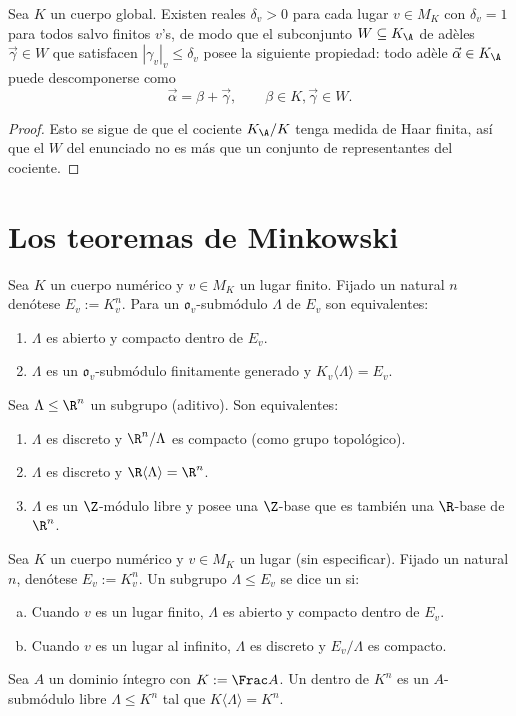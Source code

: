 \documentclass[teoria-numeros.tex]{subfiles}
\begin{document}
\begin{cor}\label{thm:adele_principal_descomposition}
	Sea $K$ un cuerpo global.
	Existen reales $\delta_v > 0$ para cada lugar $v \in M_K$ con $\delta_v = 1$ para todos salvo finitos $v$'s,
	de modo que el subconjunto $W \subseteq K_\A$ de adèles $\vec\gamma \in W$ que satisfacen $|\gamma_v|_v \le \delta_v$ posee la siguiente propiedad:
	todo adèle $\vec\alpha \in K_\A$ puede descomponerse como
	$$ \vec\alpha = \beta + \vec\gamma, \qquad \beta \in K, \vec\gamma \in W. $$
\end{cor}
\begin{proof}
	Esto se sigue de que el cociente $K_\A/K$ tenga medida de Haar finita, así que el $W$ del enunciado no es más que un conjunto de representantes
	del cociente.
\end{proof}

\section{Los teoremas de Minkowski}
\begin{lem}
	Sea $K$ un cuerpo numérico y $v \in M_K$ un lugar finito.
	Fijado un natural $n$ denótese $E_v := K_v^n$.
	Para un $\mathfrak{o}_v$-submódulo $\Lambda$ de $E_v$ son equivalentes:
	\begin{enumerate}
		\item $\Lambda$ es abierto y compacto dentro de $E_v$.
		\item $\Lambda$ es un $\mathfrak{o}_v$-submódulo finitamente generado y $K_v \langle \Lambda \rangle = E_v$.
	\end{enumerate}
\end{lem}

\begin{lem}
	Sea $\Lambda \le \R^n$ un subgrupo (aditivo).
	Son equivalentes:
	\begin{enumerate}
		\item $\Lambda$ es discreto y $\R^n/\Lambda$ es compacto (como grupo topológico).
		\item $\Lambda$ es discreto y $\R\langle \Lambda \rangle = \R^n$.
		\item $\Lambda$ es un $\Z$-módulo libre y posee una $\Z$-base que es también una $\R$-base de $\R^n$.
	\end{enumerate}
\end{lem}
\begin{mydef}
	Sea $K$ un cuerpo numérico y $v \in M_K$ un lugar (sin especificar).
	Fijado un natural $n$, denótese $E_v := K_v^n$.
	Un subgrupo $\Lambda \le E_v$ se dice un  si:
	\begin{enumerate}[(a)]
		\item Cuando $v$ es un lugar finito, $\Lambda$ es abierto y compacto dentro de $E_v$.
		\item Cuando $v$ es un lugar al infinito, $\Lambda$ es discreto y $E_v/\Lambda$ es compacto.
	\end{enumerate}

	Sea $A$ un dominio íntegro con $K := \Frac A$.
	Un  dentro de $K^n$ es un $A$-submódulo libre $\Lambda \le K^n$ tal que $K\langle \Lambda \rangle = K^n$.
\end{mydef}
\end{document}

